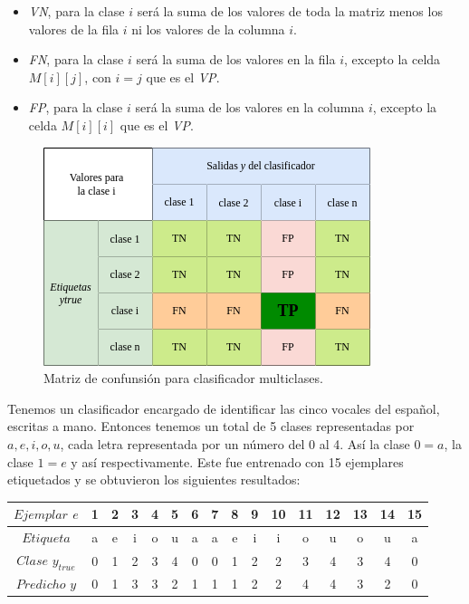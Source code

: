 \begin{description}
\begin{itemize}
  \item \emph{VN}, para la clase $i$ será la suma de los valores de toda la matriz menos los valores de la fila $i$ ni los valores de la columna $i$. 
  
  \item \emph{FN}, para la clase $i$ será la suma de los valores en la fila $i$, excepto la celda $M[i][j]$, con $i=j$ que es el \emph{VP}.
  
  \item \emph{FP}, para la clase $i$ será la suma de los valores en la columna $i$, excepto la celda $M[i][i]$ que es el \emph{VP}.
 
 \end{itemize}
 
  \begin{figure}[H]
 \centering
 \includegraphics[scale=0.7]{../Figuras/MC_multiple.png}
 \caption{Matriz de confunsión para clasificador multiclases.}
 \label{fig:mcMult} 
\end{figure}

 
 \begin{example}
Tenemos un clasificador encargado de identificar las cinco vocales del español, escritas a mano. Entonces tenemos un total de 5 clases representadas por $a, e, i, o, u$, cada letra representada por un número del 0 al 4. Así la clase $0 = a$, la clase $1 = e$ y así respectivamente. Este fue entrenado con 15 ejemplares etiquetados y se obtuvieron los siguientes resultados:


\begin{center}
\begin{tabular}{c|ccccccccccccccc}

 $Ejemplar$ $e$     & 1 & 2 & 3 & 4 & 5 & 6 & 7 & 8 & 9 & 10 & 11 & 12 & 13 & 14 & 15 \\ \hline
 $Etiqueta $      & a & e & i & o & u & a & a & e & i & i  & o  & u  & o  & u & a \\ \hline
 $Clase$ $y_{true}$ & 0 & 1 & 2 & 3 & 4 & 0 & 0 & 1 & 2 & 2  & 3  & 4  & 3  & 4 & 0 \\ \hline
 $Predicho$ $y$     & 0 & 1 & 3 & 3 & 2 & 1 & 1 & 1 & 2 & 2  & 4  & 4  & 3  & 2 & 0 \\ \hline


\end{tabular}
\end{center}
\end{example}
\end{description}

